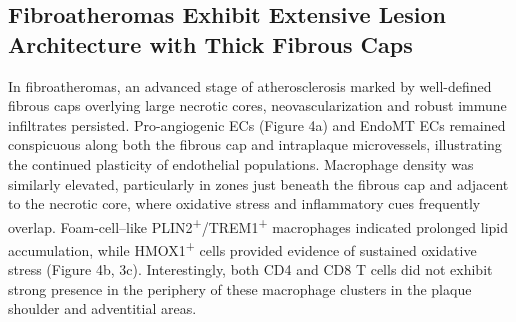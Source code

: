 \documentclass[a4paper,12pt]{article}
\begin{document}
\subsection{Fibroatheromas Exhibit Extensive Lesion Architecture with Thick Fibrous Caps}
In fibroatheromas, an advanced stage of atherosclerosis marked by well-defined fibrous caps overlying large necrotic cores, neovascularization and robust immune infiltrates persisted. Pro-angiogenic ECs (Figure 4a) and EndoMT ECs remained conspicuous along both the fibrous cap and intraplaque microvessels, illustrating the continued plasticity of endothelial populations. Macrophage density was similarly elevated, particularly in zones just beneath the fibrous cap and adjacent to the necrotic core, where oxidative stress and inflammatory cues frequently overlap. Foam-cell–like PLIN2\textsuperscript{+}/TREM1\textsuperscript{+} macrophages indicated prolonged lipid accumulation, while HMOX1\textsuperscript{+} cells provided evidence of sustained oxidative stress (Figure 4b, 3c). Interestingly, both CD4 and CD8 T cells did not exhibit strong presence in the periphery of these macrophage clusters in the plaque shoulder and adventitial areas.
\end{document}
